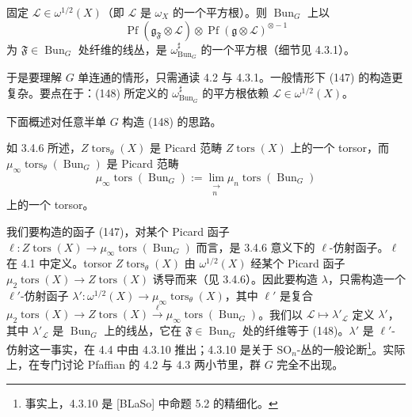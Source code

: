 
固定 $\mathcal{L}\in\omega^{1/2}(X)$（即 $\mathcal{L}$ 是 $\omega_X$ 的一个平方根）。则 $\operatorname{Bun}_G$ 上以
\begin{equation}\tag{148}
\operatorname{Pf}(\mathfrak{g}_{\mathfrak{F}}\otimes\mathcal{L})\otimes\operatorname{Pf}(\mathfrak{g}\otimes\mathcal{L})^{\otimes -1}
\end{equation}
为 $\mathfrak{F}\in\operatorname{Bun}_G$ 处纤维的线丛，是 $\omega^{\sharp}_{\operatorname{Bun}_G}$ 的一个平方根（细节见 4.3.1）。

于是要理解 $G$ 单连通的情形，只需通读 4.2 与 4.3.1。一般情形下 (147) 的构造更复杂。要点在于：(148) 所定义的 $\omega^{\sharp}_{\operatorname{Bun}_G}$ 的平方根依赖 $\mathcal{L}\in\omega^{1/2}(X)$。

 下面概述对任意半单 $G$ 构造 (148) 的思路。

如 3.4.6 所述，$Z\operatorname{tors}_{\theta}(X)$ 是 Picard 范畴 $Z\operatorname{tors}(X)$ 上的一个 torsor，而 $\mu_\infty\operatorname{tors}_{\theta}(\operatorname{Bun}_G)$ 是 Picard 范畴
\begin{equation}\tag{149}
\mu_\infty\operatorname{tors}(\operatorname{Bun}_G):=\lim_{\substack{\longrightarrow\\ n}}\mu_n\operatorname{tors}(\operatorname{Bun}_G)
\end{equation}
上的一个 torsor。


我们要构造的函子 (147)，对某个 Picard 函子 $\ell:Z\operatorname{tors}(X)\to\mu_\infty\operatorname{tors}(\operatorname{Bun}_G)$ 而言，是 3.4.6 意义下的 $\ell$-仿射函子。$\ell$ 在 4.1 中定义。torsor $Z\operatorname{tors}_{\theta}(X)$ 由 $\omega^{1/2}(X)$ 经某个 Picard 函子 $\mu_2\operatorname{tors}(X)\to Z\operatorname{tors}(X)$ 诱导而来（见 3.4.6）。因此要构造 $\lambda$，只需构造一个 $\ell'$-仿射函子 $\lambda':\omega^{1/2}(X)\to\mu_\infty\operatorname{tors}_{\theta}(X)$，其中 $\ell'$ 是复合 $\mu_2\operatorname{tors}(X)\to Z\operatorname{tors}(X)\xrightarrow{\ \ell\ }\mu_\infty\operatorname{tors}(\operatorname{Bun}_G)$。我们以 $\mathcal{L}\mapsto\lambda'_{\mathcal{L}}$ 定义 $\lambda'$，其中 $\lambda'_{\mathcal{L}}$ 是 $\operatorname{Bun}_G$ 上的线丛，它在 $\mathfrak{F}\in\operatorname{Bun}_G$ 处的纤维等于 (148)。$\lambda'$ 是 $\ell'$-仿射这一事实，在 4.4 中由 4.3.10 推出；4.3.10 是关于 $\mathrm{SO}_n$-丛的一般论断\footnote{事实上，4.3.10 是 [BLaSo] 中命题 5.2 的精细化。}。实际上，在专门讨论 Pfaffian 的 4.2 与 4.3 两小节里，群 $G$ 完全不出现。

